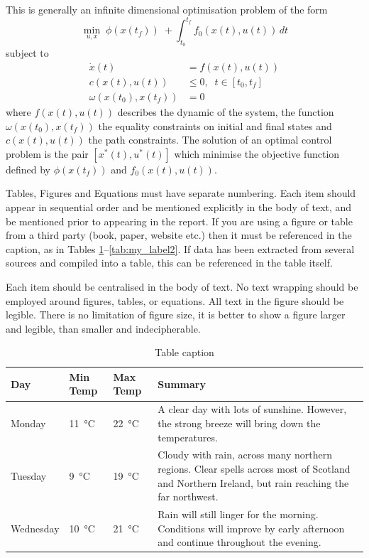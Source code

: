 \documentclass[a4paper,oneside,12pt]{book}
\begin{document}
This is generally an infinite dimensional optimisation problem of the form
\begin{equation}\label{eq:opt}
\min\limits_{u,x} \;\phi\left(x(t_f)\right) \;+\int_{t_0}^{t_f} f_0\left(x(t),u(t)\right)\,dt
\end{equation}
subject to
\begin{align}
\dot{x}(t)&=f\left(x(t),u(t)\right)\\
c\left(x(t),u(t)\right) &\leq 0,\;\; t\in[t_0,t_f]\\
\omega\left(x(t_0),x(t_f)\right) &= 0 
\end{align}
where $f(x(t), u(t))$ describes the dynamic of the system, the function $\omega(x(t_0),x(t_f))$ the equality constraints on initial and final states and $c(x(t),u(t))$ the path constraints.
The solution of an optimal control problem is the pair $[x^*(t),u^*(t)]$ which minimise the objective function defined by $\phi(x(t_f))$ and $f_0(x(t),u(t))$.

Tables, Figures and Equations must have separate numbering. Each item should appear in sequential order and be mentioned explicitly in the body of text, and be mentioned prior to appearing in the report. If you are using a figure or table from a third party (book, paper, website etc.) then it must be referenced in the caption, as in Tables \ref{tab:my_label}--\ref{tab:my_label2}. If data has been extracted from several sources and compiled into a table, this can be referenced in the table itself.

Each item should be centralised in the body of text. No text wrapping should be employed around figures, tables, or equations. All text in the figure should be legible. There is no limitation of figure size, it is better to show a figure larger and legible, than smaller and indecipherable.

\begin{table}[htb]
    \centering
    \begin{tabular}{l l l p{5cm}}
    \toprule
    Day & Min Temp & Max Temp & Summary \\ \midrule
    Monday & \SI{11}{\celsius} & \SI{22}{\celsius} & A clear day with lots of sunshine.  
    However, the strong breeze will bring down the temperatures. \\ \midrule
    Tuesday & \SI{9}{\celsius} & \SI{19}{\celsius}  & Cloudy with rain, across many northern regions. Clear spells 
    across most of Scotland and Northern Ireland, 
    but rain reaching the far northwest. \\ \midrule
    Wednesday & \SI{10}{\celsius}  & \SI{21}{\celsius}  & Rain will still linger for the morning. 
    Conditions will improve by early afternoon and continue 
    throughout the evening. \\
    \bottomrule
    \end{tabular}
    \caption{Table caption \citep{website:table}}
    \label{tab:my_label}
\end{table}
\end{document}
